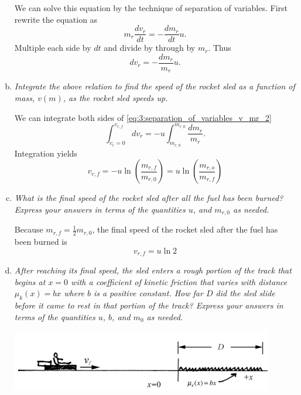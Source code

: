 \documentclass{esg8012exam}
\begin{document}
\begin{solution}
\begin{enumerate}[(a)]
      We can solve this equation by the technique of separation of variables.  First rewrite the equation as 
      \begin{equation} m_r \frac{dv_r }{dt}=-\frac{dm_r }{dt}u. \label{eq:3:separation_of_variables_v_mr_1} \end{equation}
      Multiple each side by $dt$ and divide by through by $m_r $. Thus
      \begin{equation} dv_r =-\frac{dm_r }{m_r }u. \label{eq:3:separation_of_variables_v_mr_2} \end{equation}
    \item \emph{Integrate the above relation to find the speed of the rocket sled as a function of mass, $v(m)$, as the rocket sled speeds up.} \par
      We can integrate both sides of \autoref{eq:3:separation_of_variables_v_mr_2}
      \begin{equation} \int_{v_r =0}^{v_{r,f} } {dv_r } =-u\int_{m_{r,0} }^{m_{r,0} } {\frac{dm_r }{m_r }} . \label{eq:3:integration_vr_mr} \end{equation}
      Integration yields
      \begin{equation} v_{r,f} =-u\ln \left( {\frac{m_{r,f} }{m_{r,0} }} \right)=u\ln \left( {\frac{m_{r,o} }{m_{r,f} }} \right) \label{eq:3:vrf}\end{equation}
    \item \emph{What is the final speed of the rocket sled after all the fuel has been burned? Express your answers in terms of the quantities $u$, and $m_{r,0}$ as needed.} \par
      Because $m_{r,f} =\frac12m_{r,0}$, the final speed of the rocket sled after the fuel has been burned is
      \begin{equation} v_{r,f} =u\ln 2 \label{eq:3:vf_u} \end{equation}
    \item \emph{After reaching its final speed, the sled enters a rough portion of the track that begins at $x=0$ with a coefficient of kinetic friction that varies with distance $\mu_k (x)=bx$ where $b$ is a positive constant. How far $D$ did the sled slide before it came to rest in that portion of the track? Express your answers in terms of the quantities $u$, $b$, and $m_0$ as needed.} \par
      \begin{center}\includegraphics[width=0.9\textwidth]{exam2_s3_3}\end{center}

\end{enumerate}
\end{solution}
\end{document}
